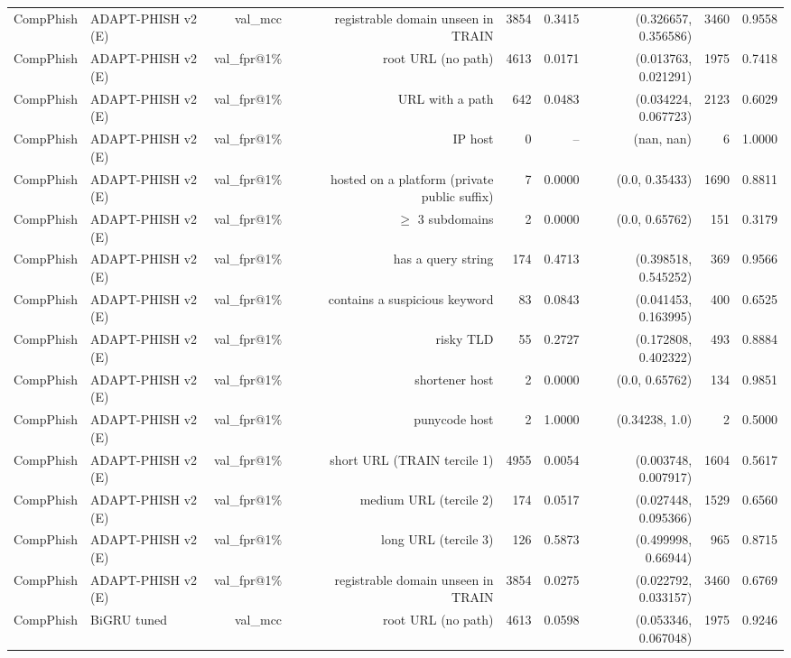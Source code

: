\begin{table}[t]
\begin{tabular}{llrrrrrrr}
CompPhish & ADAPT-PHISH v2 (E) & val\_mcc & registrable domain unseen in TRAIN & 3854 & 0.3415 & (0.326657, 0.356586) & 3460 & 0.9558 \\
CompPhish & ADAPT-PHISH v2 (E) & val\_fpr@1\% & root URL (no path) & 4613 & 0.0171 & (0.013763, 0.021291) & 1975 & 0.7418 \\
CompPhish & ADAPT-PHISH v2 (E) & val\_fpr@1\% & URL with a path & 642 & 0.0483 & (0.034224, 0.067723) & 2123 & 0.6029 \\
CompPhish & ADAPT-PHISH v2 (E) & val\_fpr@1\% & IP host & 0 & -- & (nan, nan) & 6 & 1.0000 \\
CompPhish & ADAPT-PHISH v2 (E) & val\_fpr@1\% & hosted on a platform (private public suffix) & 7 & 0.0000 & (0.0, 0.35433) & 1690 & 0.8811 \\
CompPhish & ADAPT-PHISH v2 (E) & val\_fpr@1\% & $\geq$ 3 subdomains & 2 & 0.0000 & (0.0, 0.65762) & 151 & 0.3179 \\
CompPhish & ADAPT-PHISH v2 (E) & val\_fpr@1\% & has a query string & 174 & 0.4713 & (0.398518, 0.545252) & 369 & 0.9566 \\
CompPhish & ADAPT-PHISH v2 (E) & val\_fpr@1\% & contains a suspicious keyword & 83 & 0.0843 & (0.041453, 0.163995) & 400 & 0.6525 \\
CompPhish & ADAPT-PHISH v2 (E) & val\_fpr@1\% & risky TLD & 55 & 0.2727 & (0.172808, 0.402322) & 493 & 0.8884 \\
CompPhish & ADAPT-PHISH v2 (E) & val\_fpr@1\% & shortener host & 2 & 0.0000 & (0.0, 0.65762) & 134 & 0.9851 \\
CompPhish & ADAPT-PHISH v2 (E) & val\_fpr@1\% & punycode host & 2 & 1.0000 & (0.34238, 1.0) & 2 & 0.5000 \\
CompPhish & ADAPT-PHISH v2 (E) & val\_fpr@1\% & short URL (TRAIN tercile 1) & 4955 & 0.0054 & (0.003748, 0.007917) & 1604 & 0.5617 \\
CompPhish & ADAPT-PHISH v2 (E) & val\_fpr@1\% & medium URL (tercile 2) & 174 & 0.0517 & (0.027448, 0.095366) & 1529 & 0.6560 \\
CompPhish & ADAPT-PHISH v2 (E) & val\_fpr@1\% & long URL (tercile 3) & 126 & 0.5873 & (0.499998, 0.66944) & 965 & 0.8715 \\
CompPhish & ADAPT-PHISH v2 (E) & val\_fpr@1\% & registrable domain unseen in TRAIN & 3854 & 0.0275 & (0.022792, 0.033157) & 3460 & 0.6769 \\
CompPhish & BiGRU tuned & val\_mcc & root URL (no path) & 4613 & 0.0598 & (0.053346, 0.067048) & 1975 & 0.9246 \\

\end{tabular}
\end{table}
